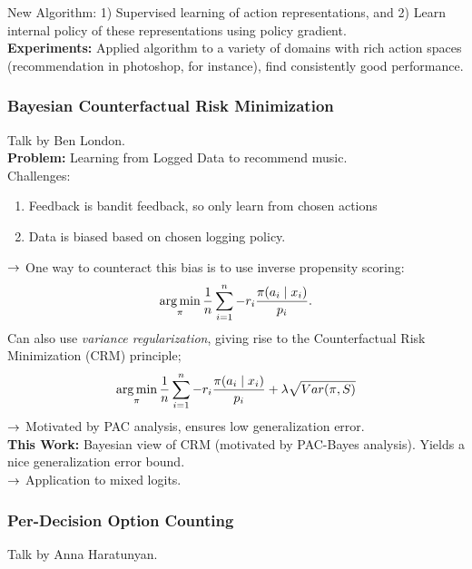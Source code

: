 New Algorithm: 1) Supervised learning of action representations, and 2) Learn internal policy of these representations using policy gradient. \\

{\bf Experiments:} Applied algorithm to a variety of domains with rich action spaces (recommendation in photoshop, for instance), find consistently good performance. \\

\spacerule

\subsubsection{Bayesian Counterfactual Risk Minimization}

Talk by Ben London. \\

{\bf Problem:} Learning from Logged Data to recommend music. \\

Challenges:
\begin{enumerate}
    \item Feedback is bandit feedback, so only learn from chosen actions
    \item Data is biased based on chosen logging policy.
\end{enumerate}

$\rightarrow$ One way to counteract this bias is to use inverse propensity scoring:
\[
\operatorname*{arg\,min}_{\pi} \frac{1}{n} \sum_{i = 1}^n -r_i \frac{\pi(a_i \mid x_i)}{p_i}.
\]
Can also use {\it variance regularization}, giving rise to the Counterfactual Risk Minimization (CRM) principle;
\[
\operatorname*{arg\,min}_{\pi} \frac{1}{n} \sum_{i = 1}^n -r_i \frac{\pi(a_i \mid x_i)}{p_i} + \lambda \sqrt{Var(\pi, S)}
\]
$\rightarrow$ Motivated by PAC analysis, ensures low generalization error. \\

{\bf This Work:} Bayesian view of CRM (motivated by PAC-Bayes analysis). Yields a nice generalization error bound. \\

$\rightarrow$ Application to mixed logits. \\

\spacerule

\subsubsection{Per-Decision Option Counting}

Talk by Anna Haratunyan. \\

